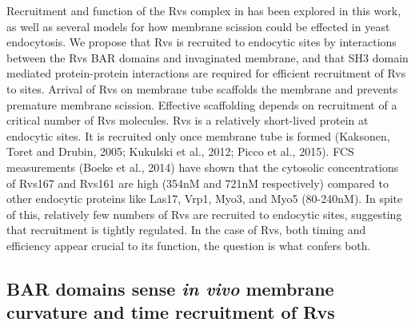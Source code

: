 \documentclass[9pt,lineno]{elife}
\begin{document}
Recruitment and function of the Rvs complex in has been explored in this work, as well as several models for how membrane scission could be effected in yeast endocytosis. We propose that Rvs is recruited to endocytic sites by interactions between the Rvs BAR domains and invaginated membrane, and that SH3 domain mediated protein-protein interactions are required for efficient recruitment of Rvs to sites. Arrival of Rvs on membrane tube scaffolds the membrane and prevents premature membrane scission. Effective scaffolding depends on recruitment of a critical number of Rvs molecules. Rvs is a relatively short-lived protein at endocytic sites. It is recruited only once membrane tube is formed (Kaksonen, Toret and Drubin, 2005; Kukulski et al., 2012; Picco et al., 2015). FCS measurements (Boeke et al., 2014) have shown that the cytosolic concentrations of Rvs167 and Rvs161 are high (354nM and 721nM respectively) compared to other endocytic proteins like Las17, Vrp1, Myo3, and Myo5 (80-240nM). In spite of this, relatively few numbers of Rvs are recruited to endocytic sites, suggesting that recruitment is tightly regulated. In the case of Rvs, both timing and efficiency appear crucial to its function, the question is what confers both.

\subsection{BAR domains sense \textit{in vivo} membrane curvature and time recruitment of Rvs}
\end{document}
